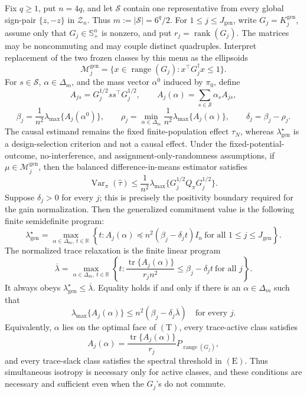 Fix \(q\ge1\), put \(n=4q\), and let \(\mathscr S\) contain one representative from every global sign-pair \(\{z,-z\}\) in \(\mathcal Z_n\). Thus \(m:=|\mathscr S|=6^q/2\). For \(1\le j\le J_{\mathrm{gen}}\), write \(G_j=K_j^{\mathrm{gen}}\), assume only that \(G_j\in\mathbb S_+^n\) is nonzero, and put \(r_j=\operatorname{rank}(G_j)\). The matrices may be noncommuting and may couple distinct quadruples. Interpret replacement of the two frozen classes by this menu as the ellipsoids
\[
\mathcal M_j^{\mathrm{gen}}
=\{x\in\operatorname{range}(G_j):x^\top G_j^\dagger x\le1\}.
\]
For \(s\in\mathscr S\), \(\alpha\in\Delta_m\), and the mass vector \(\alpha^0\) induced by \(\pi_0\), define
\[
A_{js}=G_j^{1/2}ss^\top G_j^{1/2},
\qquad
A_j(\alpha)=\sum_{s\in\mathscr S}\alpha_sA_{js},
\]
\[
\beta_j=\frac1{n^2}\lambda_{\max}\{A_j(\alpha^0)\},
\qquad
\rho_j=\min_{\alpha\in\Delta_m}\frac1{n^2}\lambda_{\max}\{A_j(\alpha)\},
\qquad
\delta_j=\beta_j-\rho_j.
\]
The causal estimand remains the fixed finite-population effect \(\tau_N\), whereas \(\lambda_{\mathrm{gen}}^\star\) is a design-selection criterion and not a causal effect. Under the fixed-potential-outcome, no-interference, and assignment-only-randomness assumptions, if \(\mu\in\mathcal M_j^{\mathrm{gen}}\), then the balanced difference-in-means estimator satisfies
\[
\operatorname{Var}_\pi(\widehat\tau)
\le \frac1{n^2}\lambda_{\max}
\{G_j^{1/2}Q_\pi G_j^{1/2}\}.
\]
Suppose \(\delta_j>0\) for every \(j\); this is precisely the positivity boundary required for the gain normalization. Then the generalized commitment value is the following finite semidefinite program:
\[
\boxed{
\lambda_{\mathrm{gen}}^\star
=\max_{\alpha\in\Delta_m,\ t\in\mathbb R}
\left\{t:
A_j(\alpha)\preceq n^2(\beta_j-\delta_jt)I_n
\ \text{for all }1\le j\le J_{\mathrm{gen}}
\right\}.}
\tag{P}
\]
The normalized trace relaxation is the finite linear program
\[
\overline\lambda
=\max_{\alpha\in\Delta_m,\ t\in\mathbb R}
\left\{t:
\frac{\operatorname{tr}\{A_j(\alpha)\}}{r_jn^2}
\le\beta_j-\delta_jt
\ \text{for all }j
\right\}.
\tag{T}
\]
It always obeys \(\lambda_{\mathrm{gen}}^\star\le\overline\lambda\). Equality holds if and only if there is an \(\alpha\in\Delta_m\) such that
\[
\lambda_{\max}\{A_j(\alpha)\}
\le n^2(\beta_j-\delta_j\overline\lambda)
\quad\text{for every }j.
\tag{E}
\]
Equivalently, \(\alpha\) lies on the optimal face of \((\mathrm T)\), every trace-active class satisfies
\[
A_j(\alpha)
=\frac{\operatorname{tr}\{A_j(\alpha)\}}{r_j}
P_{\operatorname{range}(G_j)},
\tag{I}
\]
and every trace-slack class satisfies the spectral threshold in \((\mathrm E)\). Thus simultaneous isotropy is necessary only for active classes, and these conditions are necessary and sufficient even when the \(G_j\)'s do not commute.

